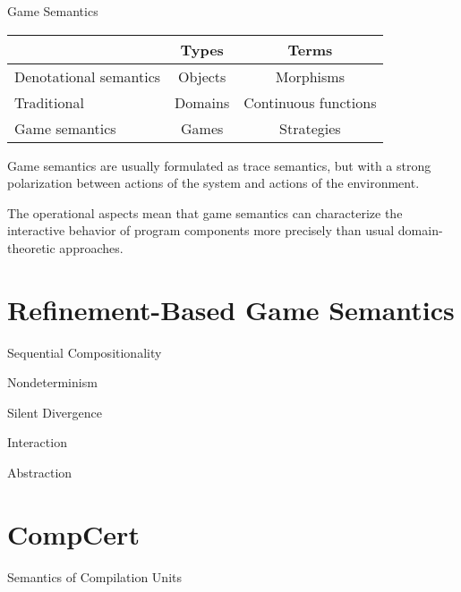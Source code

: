 \documentclass{beamer}
\begin{document}
\begin{frame}{Game Semantics} %
\begin{center}
  \begin{tabular}{lcc}
  \hline
   & Types & Terms \\
  \hline
  Denotational semantics & Objects & Morphisms \\
  Traditional & Domains & Continuous functions \\
  Game semantics & Games & Strategies \\
  \hline
  \end{tabular}
\end{center}

Game semantics are usually formulated as trace semantics,
but with a strong polarization between actions
of the system and actions of the environment.

The operational aspects
mean that game semantics can characterize
the interactive behavior of program components
more precisely than
usual domain-theoretic approaches.
\end{frame}

\section{Refinement-Based Game Semantics}

\begin{frame}{Sequential Compositionality} %
\end{frame}

\begin{frame}{Nondeterminism} %
\end{frame}

\begin{frame}{Silent Divergence} %
\end{frame}

\begin{frame}{Interaction} %
\end{frame}

\begin{frame}{Abstraction} %
\end{frame}

\section{CompCert}

\begin{frame}{Semantics of Compilation Units} %
\end{frame}
\end{document}
